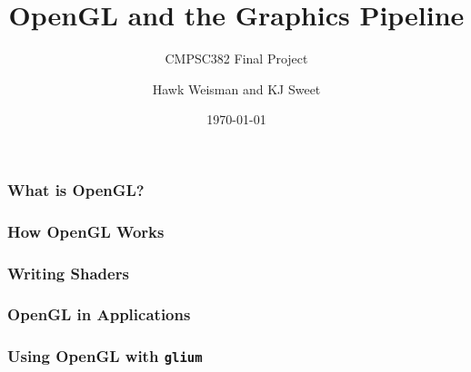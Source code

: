 \documentclass{beamer}
\title[OpenGL]{OpenGL and the Graphics Pipeline}
\subtitle{CMPSC382 Final Project}
\author[Hawk Weisman and KJ Sweet]{Hawk Weisman and KJ Sweet}
\institute[Allegheny College]{Department of Computer Science \\ Allegheny College}
\date{\today}
\begin{document}
\maketitle

\begin{frame}
\frametitle{What is OpenGL?}
\end{frame}

\begin{frame}
\frametitle{How OpenGL Works}
\end{frame}

\begin{frame}
\frametitle{Writing Shaders}
\end{frame}

\begin{frame}
\frametitle{OpenGL in Applications}
\end{frame}

\begin{frame}
\frametitle{Using OpenGL with \texttt{glium}}
\end{frame}
\end{document}
